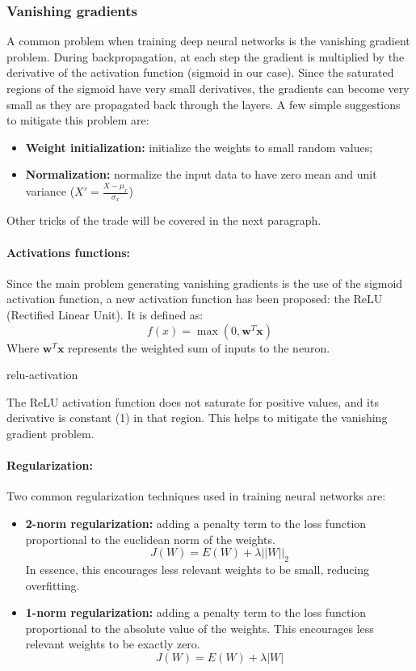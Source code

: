\subsubsection{Vanishing gradients}
A common problem when training deep neural networks is the vanishing gradient problem. During backpropagation, at each step the 
gradient is multiplied by the derivative of the activation function (sigmoid in our case). 
Since the saturated regions of the sigmoid have very small derivatives, the gradients can become very small as they are propagated back through the layers.
A few simple suggestions to mitigate this problem are:
\begin{itemize}
    \item \textbf{Weight initialization:} initialize the weights to small random values;
    \item \textbf{Normalization:} normalize the input data to have zero mean and unit variance ($X' = \frac{X - \mu_x}{\sigma_x}$)
\end{itemize}
Other tricks of the trade will be covered in the next paragraph.
\paragraph{Activations functions:}
Since the main problem generating vanishing gradients is the use of the sigmoid activation function, a new activation function has been proposed: the ReLU (Rectified Linear Unit).
It is defined as:
\[ f(x) = \max(0, \boldsymbol{w}^T \boldsymbol{x}) \]
Where $\boldsymbol{w}^T \boldsymbol{x}$ represents the weighted sum of inputs to the neuron.
\begin{center}
{relu-activation}
\end{center}
The ReLU activation function does not saturate for positive values, and its derivative is constant (1) in that region. This helps to mitigate the vanishing gradient problem.

\paragraph{Regularization:}
Two common regularization techniques used in training neural networks are:
\begin{itemize}
  \item \textbf{2-norm regularization:} adding a penalty term to the loss function proportional to the euclidean norm of the weights.
  \[ J(W) = E(W) + \lambda ||W||_2 \]
  In essence, this encourages less relevant weights to be small, reducing overfitting.
  \item \textbf{1-norm regularization:} adding a penalty term to the loss function proportional to the absolute value of the weights.
  This encourages less relevant weights to be exactly zero.
  \[ J(W) = E(W) + \lambda |W| \]
\end{itemize}

